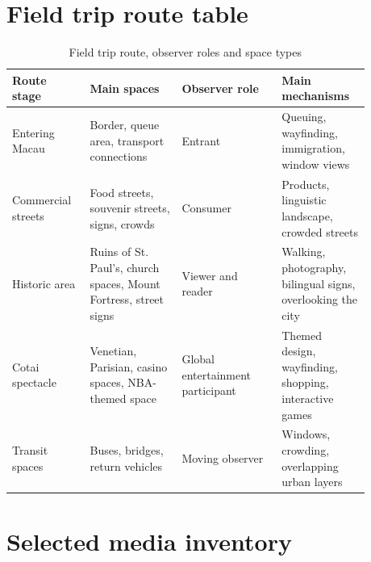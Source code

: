 \documentclass[12pt,a4paper]{article}
\begin{document}
\appendix

\section{Field trip route table}

\begin{table}[H]
\centering
\caption{Field trip route, observer roles and space types}
\begin{tabular}{>{\raggedright\arraybackslash}p{0.18\linewidth}>{\raggedright\arraybackslash}p{0.23\linewidth}>{\raggedright\arraybackslash}p{0.25\linewidth}>{\raggedright\arraybackslash}p{0.22\linewidth}}
\toprule
Route stage & Main spaces & Observer role & Main mechanisms \\
\midrule
Entering Macau & Border, queue area, transport connections & Entrant & Queuing, wayfinding, immigration, window views \\
Commercial streets & Food streets, souvenir streets, signs, crowds & Consumer & Products, linguistic landscape, crowded streets \\
Historic area & Ruins of St. Paul's, church spaces, Mount Fortress, street signs & Viewer and reader & Walking, photography, bilingual signs, overlooking the city \\
Cotai spectacle & Venetian, Parisian, casino spaces, NBA-themed space & Global entertainment participant & Themed design, wayfinding, shopping, interactive games \\
Transit spaces & Buses, bridges, return vehicles & Moving observer & Windows, crowding, overlapping urban layers \\
\bottomrule
\end{tabular}
\end{table}

\section{Selected media inventory}
\end{document}
